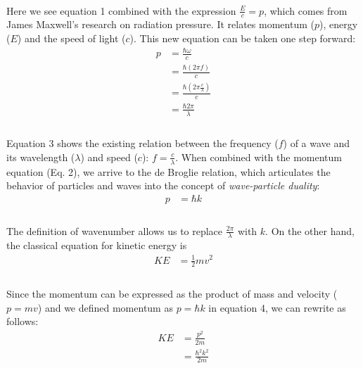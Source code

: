 \documentclass[letter]{article}
\begin{document}
\begin{enumerate}
    \paragraph{} Here we see equation 1 combined with the expression $\frac{E}{c}=p$, which comes from James Maxwell's research on radiation pressure. It relates momentum ($p$), energy ($E$) and the speed of light ($c$). This new equation can be taken one step forward:
    \begin{equation}
        \begin{split}
            p   &= \frac{\hbar \omega}{c}\\
                &= \frac{\hbar(2\pi f)}{c}\\
                &= \frac{\hbar(2\pi \frac{c}{\lambda})}{c}\\
                &= \frac{\hbar 2\pi}{\lambda}\\
        \end{split}
    \end{equation}
    \paragraph{} Equation 3 shows the existing relation between the frequency ($f$) of a wave and its wavelength ($\lambda$) and speed ($c$): $f=\frac{c}{\lambda}$. When combined with the momentum equation (Eq. 2), we arrive to the de Broglie relation, which articulates the behavior of particles and waves into the concept of \textit{wave-particle duality}:
    \begin{equation}
        \begin{split}
            p &= \hbar k\\
        \end{split}
    \end{equation}
    \paragraph{} The definition of wavenumber allows us to replace $\frac{2\pi}{\lambda}$ with $k$. On the other hand, the classical equation for kinetic energy is
    \begin{equation}
        \begin{split}
            KE  &= \frac{1}{2}mv^2\\
        \end{split}
    \end{equation}
    \paragraph{} Since the momentum can be expressed as the product of mass and velocity ($p=mv$) and we defined momentum as $p=\hbar k$ in equation 4, we can rewrite as follows:
    \begin{equation}
        \begin{split}
            KE  &= \frac{p^2}{2m}\\
                &= \frac{\hbar^2 k^2}{2m}\\
        \end{split}
    \end{equation}

\end{enumerate}
\end{document}
